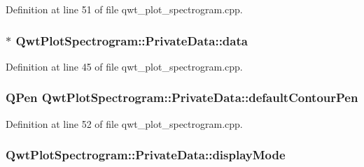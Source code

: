 Definition at line 51 of file qwt\-\_\-plot\-\_\-spectrogram.\-cpp.

\hypertarget{class_qwt_plot_spectrogram_1_1_private_data_a5dfc458e70a29037fa30466ed351581e}{
\subsubsection[{data}]{$\ast$ Qwt\-Plot\-Spectrogram\-::\-Private\-Data\-::data}}\label{class_qwt_plot_spectrogram_1_1_private_data_a5dfc458e70a29037fa30466ed351581e}


Definition at line 45 of file qwt\-\_\-plot\-\_\-spectrogram.\-cpp.

\hypertarget{class_qwt_plot_spectrogram_1_1_private_data_aaec8757fce4a141e028d7916c6414025}{
\subsubsection[{default\-Contour\-Pen}]{\setlength{\rightskip}{0pt plus 5cm}Q\-Pen Qwt\-Plot\-Spectrogram\-::\-Private\-Data\-::default\-Contour\-Pen}}\label{class_qwt_plot_spectrogram_1_1_private_data_aaec8757fce4a141e028d7916c6414025}


Definition at line 52 of file qwt\-\_\-plot\-\_\-spectrogram.\-cpp.

\hypertarget{class_qwt_plot_spectrogram_1_1_private_data_afa7abe119f84de95e0223ab7651276f3}{
\subsubsection[{display\-Mode}]{ Qwt\-Plot\-Spectrogram\-::\-Private\-Data\-::display\-Mode}}\label{class_qwt_plot_spectrogram_1_1_private_data_afa7abe119f84de95e0223ab7651276f3}


